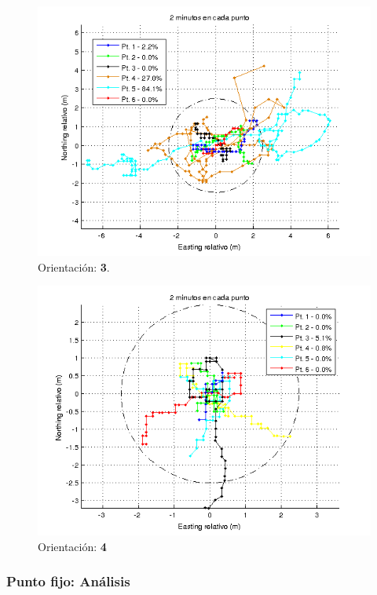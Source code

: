 \documentclass[spanish,12pt,a4paper,titlepage]{report}
\begin{document}
\newpage
\begin{figure}[h!]
  \includegraphics[width=1\textwidth]{./img/or2_todos_cut.png}
  \caption{Orientación: \textbf{3}.}
\vspace{-30pt}
  \label{fig:or2_todos_cut.png}
\end{figure}

\begin{figure}[h!]
  \includegraphics[width=.9\textwidth]{./img/or3_todos.png}
  \caption{Orientación: \textbf{4}}
  \label{fig:or3_todos.png}
\end{figure}

\newpage
\subsubsection{Punto fijo: Análisis}
\label{sec:gps2-punto-fijo-analisis}
\end{document}
